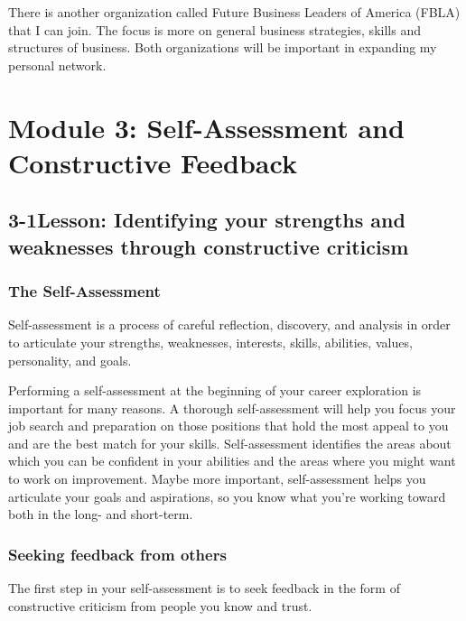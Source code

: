 There is another organization called Future Business Leaders of America (FBLA) that I can join. The focus is more on general business strategies, skills and structures of business. Both organizations will be important in expanding my personal network.
 
\pagebreak \section*{Module 3:	Self-Assessment and Constructive Feedback}
\noindent\makebox[\textwidth]{\rule{\linewidth}{0.4pt}} 
\localtableofcontents 
\noindent\makebox[\textwidth]{\rule{\linewidth}{0.4pt}} 


\pagebreak \subsection*{3-1\quad Lesson: Identifying your strengths and weaknesses through constructive criticism}
\subsubsection*{The Self-Assessment}
Self-assessment is a process of careful reflection, discovery, and analysis in order to articulate your strengths, weaknesses, interests, skills, abilities, values, personality, and goals.

Performing a self-assessment at the beginning of your career exploration is important for many reasons. A thorough self-assessment will help you focus your job search and preparation on those positions that hold the most appeal to you and are the best match for your skills. Self-assessment identifies the areas about which you can be confident in your abilities and the areas where you might want to work on improvement. Maybe more important, self-assessment helps you articulate your goals and aspirations, so you know what you're working toward both in the long- and short-term.

\subsubsection*{Seeking feedback from others}
The first step in your self-assessment is to seek feedback in the form of constructive criticism from people you know and trust.
